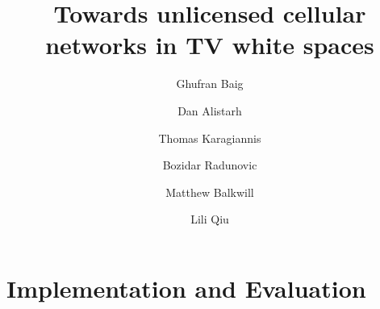 \documentclass[10pt, sigconf]{acmart}
\begin{document}
\title{Towards unlicensed cellular networks in TV white spaces}

\author{Ghufran Baig}
\orcid{}

\author{Dan Alistarh}
\orcid{}

\author{Thomas Karagiannis}
\orcid{}

\author{Bozidar Radunovic}
\orcid{}

\author{Matthew Balkwill}
\orcid{}

\author{Lili Qiu}
\orcid{}





\maketitle












\section{Implementation and Evaluation}







%











%
\end{document}
